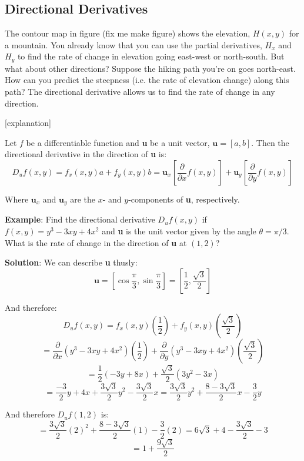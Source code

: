 \subsection{Directional Derivatives}
The contour map in figure (fix me make figure) shows the elevation, $H(x, y)$ 
for a mountain. You already know that you can use the partial derivatives, 
$H_x$ and $H_y$ to find the rate of change in elevation going east-west or 
north-south. But what about other directions? Suppose the hiking path you're 
on goes north-east. How can you predict the steepness (i.e. the rate of 
elevation change) along this path? The directional derivative allows us to 
find the rate of change in any direction. 

[explanation]

\begin{mdframed}[style = important, frametitle = {The Directional Derivative}]
Let $f$ be a differentiable function and \textbf{u} be a unit vector, 
$\textbf{u} = \left[ a, b \right]$. Then the directional derivative in the direction of 
\textbf{u} is:
$$D_u f(x, y) = f_x(x, y)a + f_y(x, y)b = \textbf{u}_x \left[ \frac{\partial}{
\partial x} f(x, y) \right] + \textbf{u}_y \left[ \frac{\partial}{\partial y} 
f(x, y) \right]$$
\end{mdframed}

Where $\textbf{u}_x$ and $\textbf{u}_y$ are the $x$- and $y$-components of 
\textbf{u}, respectively. 

\textbf{Example}: Find the directional derivative $D_u f(x, y)$ if $f(x, y) = 
y^3 - 3xy + 4x^2$ and \textbf{u} is the unit vector given by the angle $\theta 
= \pi/3$. What is the rate of change in the direction of \textbf{u} at $(1, 2)$?

\textbf{Solution}: We can describe \textbf{u} thusly:
$$\textbf{u} = \left[ \cos{ \frac{\pi}{3} }, \sin{ \frac{\pi}{3}} \right] = 
\left[ \frac{1}{2}, \frac{\sqrt{3}}{2} \right]$$

And therefore:
$$D_u f(x, y) = f_x(x, y) \left( \frac{1}{2} \right) + f_y(x, y) \left( \frac{
\sqrt{3}}{2} \right) $$
$$= \frac{\partial}{\partial x} \left( y^3 - 3xy + 4x^2 \right) \left( 
\frac{1}{2} \right) + \frac{\partial}{\partial y} \left( y^3 - 3xy + 4x^2 
\right) \left( \frac{\sqrt{3}}{2} \right)$$
$$= \frac{1}{2} \left( -3y + 8x \right) + \frac{\sqrt{3}}{2} \left( 3y^2 - 3x 
\right)$$
$$= \frac{-3}{2}y + 4x + \frac{3\sqrt{3}}{2}y^2 - \frac{3\sqrt{3}}{2}x = \frac{
3\sqrt{3}}{2}y^2 + \frac{8-3\sqrt{3}}{2}x - \frac{3}{2}y$$

And therefore $D_u f(1, 2)$ is:
$$= \frac{3\sqrt{3}}{2} \left( 2 \right)^2 + \frac{8 - 3\sqrt{3}}{2} \left( 1 
\right) - \frac{3}{2} \left( 2 \right) = 6\sqrt{3} + 4 - \frac{3\sqrt{3}}{2} - 
3$$
$$= 1 + \frac{9\sqrt{3}}{2}$$

